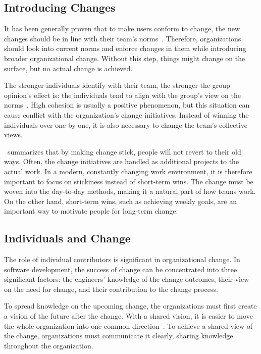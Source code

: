 \subsection{Introducing Changes}

It has been generally proven that to make users conform to change, the new changes should be in line with their team's norms~\cite{terry_attitude-behaviour_2000}. Therefore, organizations should look into current norms and enforce changes in them while introducing broader organizational change. Without this step, things might change on the surface, but no actual change is achieved. 

The stronger individuals identify with their team, the stronger the group opinion's effect is: the individuals tend to align with the group's view on the norms~\cite{terry_attitude-behaviour_2000}. High cohesion is usually a positive phenomenon, but this situation can cause conflict with the organization's change initiatives. Instead of winning the individuals over one by one, it is also necessary to change the team's collective views.

\citet{kotter_leading_1995}~summarizes that by making change stick, people will not revert to their old ways. Often, the change initiatives are handled as additional projects to the actual work. In a modern, constantly changing work environment, it is therefore important to focus on stickiness instead of short-term wins. The change must be woven into the day-to-day methods, making it a natural part of how teams work. On the other hand, short-term wins, such as achieving weekly goals, are an important way to motivate people for long-term change.~\cite{kotter_leading_1995}

\subsection{Individuals and Change}

The role of individual contributors is significant in organizational change. In software development, the success of change can be concentrated into three significant factors: the engineers' knowledge of the change outcomes, their view on the need for change, and their contribution to the change process.~\cite{lenberg_initial_2017} 

To spread knowledge on the upcoming change, the organizations must first create a vision of the future after the change. With a shared vision, it is easier to move the whole organization into one common direction~\cite{kotter_leading_1995}. To achieve a shared view of the change, organizations must communicate it clearly, sharing knowledge throughout the organization. 

